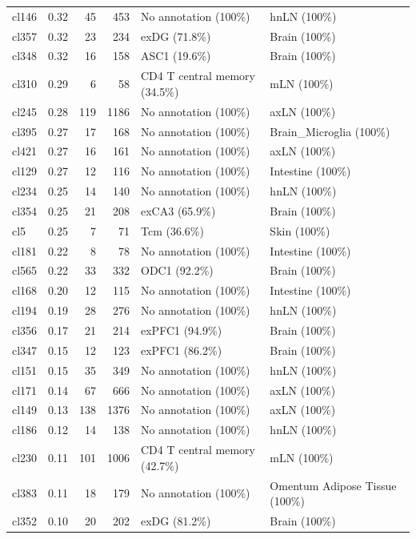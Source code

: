 \begin{table}[ht!]
\begin{tabular}{lrrrll}
  cl146 & 0.32 &  45 & 453 & No annotation (100\%) & hnLN (100\%) \\ 
  cl357 & 0.32 &  23 & 234 & exDG (71.8\%) & Brain (100\%) \\ 
  cl348 & 0.32 &  16 & 158 & ASC1 (19.6\%) & Brain (100\%) \\ 
  cl310 & 0.29 &   6 &  58 & CD4 T central memory (34.5\%) & mLN (100\%) \\ 
  cl245 & 0.28 & 119 & 1186 & No annotation (100\%) & axLN (100\%) \\ 
  cl395 & 0.27 &  17 & 168 & No annotation (100\%) & Brain\_Microglia (100\%) \\ 
  cl421 & 0.27 &  16 & 161 & No annotation (100\%) & axLN (100\%) \\ 
  cl129 & 0.27 &  12 & 116 & No annotation (100\%) & Intestine (100\%) \\ 
  cl234 & 0.25 &  14 & 140 & No annotation (100\%) & hnLN (100\%) \\ 
  cl354 & 0.25 &  21 & 208 & exCA3 (65.9\%) & Brain (100\%) \\ 
  cl5 & 0.25 &   7 &  71 & Tcm (36.6\%) & Skin (100\%) \\ 
  cl181 & 0.22 &   8 &  78 & No annotation (100\%) & Intestine (100\%) \\ 
  cl565 & 0.22 &  33 & 332 & ODC1 (92.2\%) & Brain (100\%) \\ 
  cl168 & 0.20 &  12 & 115 & No annotation (100\%) & Intestine (100\%) \\ 
  cl194 & 0.19 &  28 & 276 & No annotation (100\%) & hnLN (100\%) \\ 
  cl356 & 0.17 &  21 & 214 & exPFC1 (94.9\%) & Brain (100\%) \\ 
  cl347 & 0.15 &  12 & 123 & exPFC1 (86.2\%) & Brain (100\%) \\ 
  cl151 & 0.15 &  35 & 349 & No annotation (100\%) & hnLN (100\%) \\ 
  cl171 & 0.14 &  67 & 666 & No annotation (100\%) & axLN (100\%) \\ 
  cl149 & 0.13 & 138 & 1376 & No annotation (100\%) & axLN (100\%) \\ 
  cl186 & 0.12 &  14 & 138 & No annotation (100\%) & hnLN (100\%) \\ 
  cl230 & 0.11 & 101 & 1006 & CD4 T central memory (42.7\%) & mLN (100\%) \\ 
  cl383 & 0.11 &  18 & 179 & No annotation (100\%) & Omentum Adipose Tissue (100\%) \\ 
  cl352 & 0.10 &  20 & 202 & exDG (81.2\%) & Brain (100\%) \\ 

\end{tabular}
\end{table}
